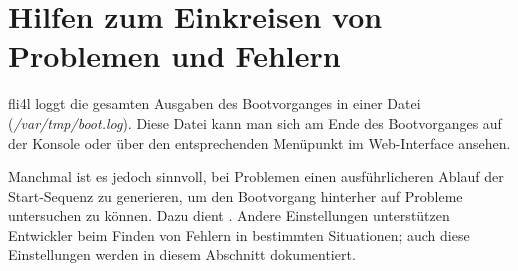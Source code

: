 \section{Hilfen zum Einkreisen von Problemen und Fehlern}

fli4l loggt die gesamten Ausgaben des Bootvorganges in einer Datei
(\emph{/var/tmp/boot.log}). Diese Datei kann man sich am Ende des
Bootvorganges auf der Konsole oder über den entsprechenden
Menüpunkt im Web-Interface ansehen.

Manchmal ist es jedoch sinnvoll, bei Problemen einen ausführlicheren
Ablauf der Start-Sequenz zu generieren, um den Bootvorgang hinterher auf
Probleme untersuchen zu können. Dazu dient . Andere
Einstellungen unterstützen Entwickler beim Finden von Fehlern in bestimmten
Situationen; auch diese Einstellungen werden in diesem Abschnitt dokumentiert.


